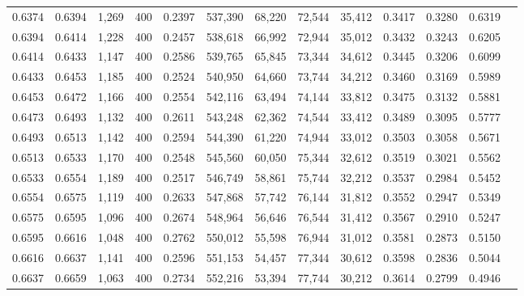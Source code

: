 \begin{tabular}{rrrrrrrrrrrrr}
0.6374 & 0.6394 &  1,269 & 400 &                                     0.2397 & 537,390 &  68,220 &  72,544 &  35,412 & 0.3417 & 0.3280 & 0.6319 \\
0.6394 & 0.6414 &  1,228 & 400 &                                     0.2457 & 538,618 &  66,992 &  72,944 &  35,012 & 0.3432 & 0.3243 & 0.6205 \\
0.6414 & 0.6433 &  1,147 & 400 &                                     0.2586 & 539,765 &  65,845 &  73,344 &  34,612 & 0.3445 & 0.3206 & 0.6099 \\
0.6433 & 0.6453 &  1,185 & 400 &                                     0.2524 & 540,950 &  64,660 &  73,744 &  34,212 & 0.3460 & 0.3169 & 0.5989 \\
0.6453 & 0.6472 &  1,166 & 400 &                                     0.2554 & 542,116 &  63,494 &  74,144 &  33,812 & 0.3475 & 0.3132 & 0.5881 \\
0.6473 & 0.6493 &  1,132 & 400 &                                     0.2611 & 543,248 &  62,362 &  74,544 &  33,412 & 0.3489 & 0.3095 & 0.5777 \\
0.6493 & 0.6513 &  1,142 & 400 &                                     0.2594 & 544,390 &  61,220 &  74,944 &  33,012 & 0.3503 & 0.3058 & 0.5671 \\
0.6513 & 0.6533 &  1,170 & 400 &                                     0.2548 & 545,560 &  60,050 &  75,344 &  32,612 & 0.3519 & 0.3021 & 0.5562 \\
0.6533 & 0.6554 &  1,189 & 400 &                                     0.2517 & 546,749 &  58,861 &  75,744 &  32,212 & 0.3537 & 0.2984 & 0.5452 \\
0.6554 & 0.6575 &  1,119 & 400 &                                     0.2633 & 547,868 &  57,742 &  76,144 &  31,812 & 0.3552 & 0.2947 & 0.5349 \\
0.6575 & 0.6595 &  1,096 & 400 &                                     0.2674 & 548,964 &  56,646 &  76,544 &  31,412 & 0.3567 & 0.2910 & 0.5247 \\
0.6595 & 0.6616 &  1,048 & 400 &                                     0.2762 & 550,012 &  55,598 &  76,944 &  31,012 & 0.3581 & 0.2873 & 0.5150 \\
0.6616 & 0.6637 &  1,141 & 400 &                                     0.2596 & 551,153 &  54,457 &  77,344 &  30,612 & 0.3598 & 0.2836 & 0.5044 \\
0.6637 & 0.6659 &  1,063 & 400 &                                     0.2734 & 552,216 &  53,394 &  77,744 &  30,212 & 0.3614 & 0.2799 & 0.4946 \\

\end{tabular}
